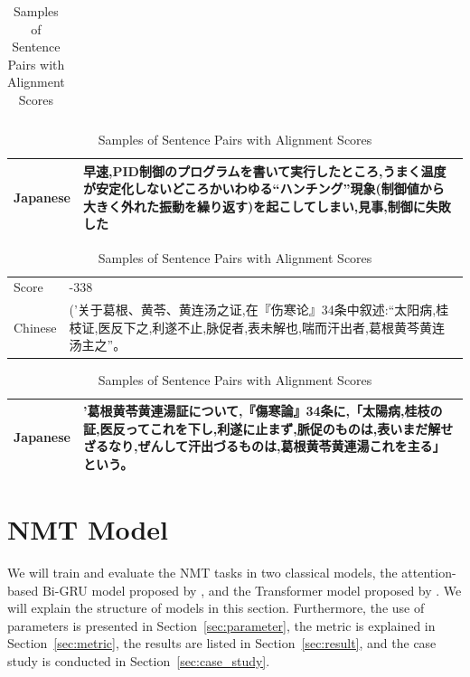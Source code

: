\begin{table}[h]
\begin{CJK}{UTF8}{gbsn}
\begin{tabularx}{\textwidth}{lb}
        \end{tabularx}
    \end{CJK}
    \begin{CJK}{UTF8}{ipxm}
        \begin{tabularx}{\textwidth}{lb}
            Japanese & 早速,PID制御のプログラムを書いて実行したところ,うまく温度が安定化しないどころかいわゆる“ハンチング”現象(制御値から大きく外れた振動を繰り返す)を起こしてしまい,見事,制御に失敗した \\
            \midrule
        \end{tabularx}
    \end{CJK}
    \begin{CJK}{UTF8}{gbsn}
        \begin{tabularx}{\textwidth}{lb}
            Score & -338 \\
            {Chinese } & ('关于葛根、黄苓、黄连汤之证,在『伤寒论』34条中叙述:“太阳病,桂枝证,医反下之,利遂不止,脉促者,表未解也,喘而汗出者,葛根黄芩黄连汤主之”。 \\
        \end{tabularx}
    \end{CJK}
    \begin{CJK}{UTF8}{ipxm}
        \begin{tabularx}{\textwidth}{lb}
            Japanese & '葛根黄苓黄連湯証について,『傷寒論』34条に,「太陽病,桂枝の証,医反ってこれを下し,利遂に止まず,脈促のものは,表いまだ解せざるなり,ぜんして汗出づるものは,葛根黄苓黄連湯これを主る」という。 \\
            \midrule
        \end{tabularx}
    \end{CJK}
    \caption{Samples of Sentence Pairs with Alignment Scores}
    \label{tab:alignment_samples}
\end{table}

\section{NMT Model} \label{sec:nmt_model}

We will train and evaluate the NMT tasks in two classical models, the attention-based Bi-GRU model proposed by \cite{bahdanau2014neural}, and the Transformer model proposed by \cite{NIPS2017_3f5ee243}. We will explain the structure of models in this section. Furthermore, the use of parameters is presented in Section~\ref{sec:parameter}, the metric is explained in Section~\ref{sec:metric}, the results are listed in Section~\ref{sec:result}, and the case study is conducted in Section~\ref{sec:case_study}.

